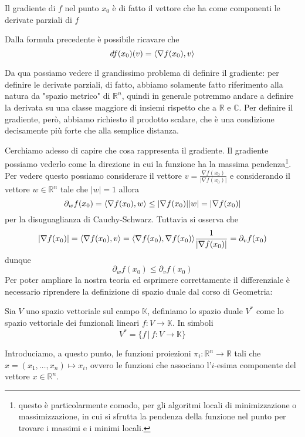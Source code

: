 \documentclass[openany, italian]{book}
\begin{document}
\begin{remark}
Il gradiente di $f$ nel punto $x_0$ è di fatto il vettore che ha come componenti le derivate parziali di $f$
\end{remark}
\noindent Dalla formula precedente è possibile ricavare che
$$
df(x_0)(v) = \langle \nabla{f(x_0)}, v \rangle
$$
\begin{remark}
Da qua possiamo vedere il grandissimo problema di definire il gradiente: per definire le derivate parziali, di fatto, abbiamo solamente fatto riferimento alla natura da "spazio metrico" di $\mathbb{R}^n$, quindi in generale potremmo andare a definire la derivata su una classe maggiore di insiemi rispetto che a $\mathbb{R}$ e $\mathbb{C}$. Per definire il gradiente, però, abbiamo richiesto il prodotto scalare, che è una condizione decisamente più forte che alla semplice distanza.
\end{remark}
\noindent Cerchiamo adesso di capire che cosa rappresenta il gradiente. Il gradiente possiamo vederlo come la direzione in cui la funzione ha la massima pendenza\footnote{questo è particolarmente comodo, per gli algoritmi locali di minimizzazione o massimizzazione, in cui si sfrutta la pendenza della funzione nel punto per trovare i massimi e i minimi locali.}. Per vedere questo possiamo considerare il vettore $v = \frac{\nabla f(x_0)}{|\nabla f(x_0)|}$ e considerando il vettore $w \in \mathbb{R}^n$ tale che $|w| = 1$ allora
$$
\partial_w f(x_0) = \langle \nabla{f(x_0)}, w \rangle \leq |\nabla{f(x_0)}||w| = |\nabla{f(x_0)}|
$$
per la disuguaglianza di Cauchy-Schwarz. Tuttavia si osserva che
$$
|\nabla{f(x_0)}| = \langle \nabla{f(x_0)}, v \rangle = \langle \nabla{f(x_0)}, \nabla{f(x_0)} \rangle \frac{1}{|\nabla{f(x_0)}|} = \partial_v f(x_0)
$$
dunque
$$
\partial_w f(x_0) \leq \partial_v f(x_0)
$$
Per poter ampliare la nostra teoria ed esprimere correttamente il differenziale è necessario riprendere la definizione di spazio duale dal corso di Geometria:
\begin{definition}
Sia $V$ uno spazio vettoriale sul campo $\mathbb{K}$, definiamo lo spazio duale $V^{*}$ come lo spazio vettoriale dei funzionali lineari $f: V \to \mathbb{K}$. In simboli
$$
V^{*} = \{f \, | \, f: V \to \mathbb{K} \}
$$
\end{definition}
\noindent Introduciamo, a questo punto, le funzioni proiezioni $\pi_i: \mathbb{R}^n \to \mathbb{R}$ tali che $x = (x_1, \ldots, x_n) \mapsto x_i$, ovvero le funzioni che associano l'$i$-esima componente del vettore $x \in \mathbb{R}^n$. \\
\end{document}
